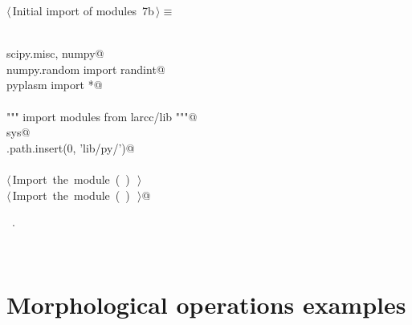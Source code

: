 \documentclass[11pt,oneside]{article}	%
\begin{document}
\begin{flushleft} \small
\begin{minipage}{\linewidth} \label{scrap11}
\protect{}$\langle\,$Initial import of modules\nobreak\ {\footnotesize 7b}$\,\rangle\equiv$
\vspace{-1ex}
\begin{list}{}{} \item
\mbox{}\verb@@\\
\mbox{}\verb@import scipy.misc, numpy@\\
\mbox{}\verb@from numpy.random import randint@\\
\mbox{}\verb@from pyplasm import *@\\
\mbox{}\verb@@\\
\mbox{}\verb@""" import modules from larcc/lib """@\\
\mbox{}\verb@import sys@\\
\mbox{}\verb@sys.path.insert(0, 'lib/py/')@\\
\mbox{}\verb@@\\
\mbox{}\verb@@\hbox{$\langle\,$Import the module\nobreak\ ({\footnotesize {}\label{scrap12}
 }\mbox{}\verb@largrid@ ) {\footnotesize {}}$\,\rangle$}\verb@@\\
\mbox{}\verb@@\hbox{$\langle\,$Import the module\nobreak\ ({\footnotesize {}\label{scrap13}
 }\mbox{}\verb@morph@ ) {\footnotesize {}}$\,\rangle$}\verb@ @\\
\mbox{}\verb@@{\NWsep}
\end{list}
\vspace{-1ex}
\footnotesize\addtolength{\baselineskip}{-1ex}
\begin{list}{}{\setlength{\itemsep}{-\parsep}\setlength{\itemindent}{-\leftmargin}}
\item \NWtxtMacroRefIn\ .
\end{list}
\end{minipage}\\[4ex]
\end{flushleft}


\section{Morphological operations examples}
\end{document}
